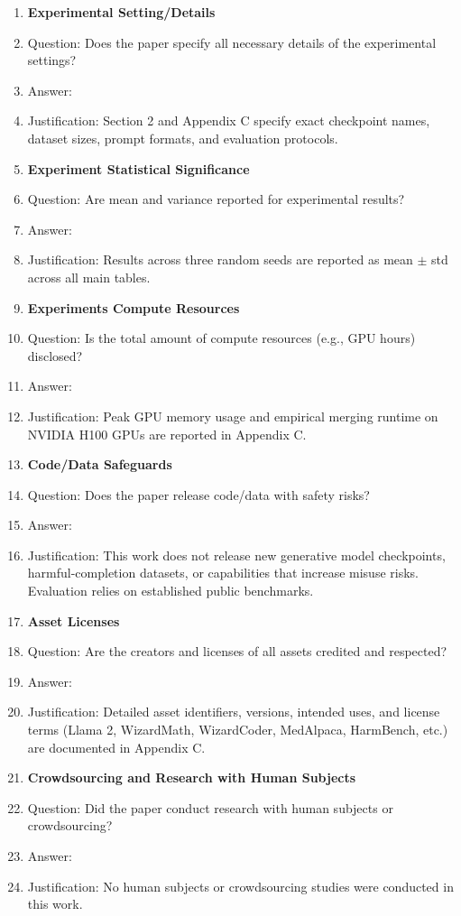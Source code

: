 \begin{enumerate}
\item {\bf Experimental Setting/Details}
  \item[] Question: Does the paper specify all necessary details of the experimental settings?
  \item[] Answer: \answerYes{}
  \item[] Justification: Section 2 and Appendix C specify exact checkpoint names, dataset sizes, prompt formats, and evaluation protocols.

\item {\bf Experiment Statistical Significance}
  \item[] Question: Are mean and variance reported for experimental results?
  \item[] Answer: \answerYes{}
  \item[] Justification: Results across three random seeds are reported as mean $\pm$ std across all main tables.

\item {\bf Experiments Compute Resources}
  \item[] Question: Is the total amount of compute resources (e.g., GPU hours) disclosed?
  \item[] Answer: \answerYes{}
  \item[] Justification: Peak GPU memory usage and empirical merging runtime on NVIDIA H100 GPUs are reported in Appendix C.

\item {\bf Code/Data Safeguards}
  \item[] Question: Does the paper release code/data with safety risks?
  \item[] Answer: \answerNA{}
  \item[] Justification: This work does not release new generative model checkpoints, harmful-completion datasets, or capabilities that increase misuse risks. Evaluation relies on established public benchmarks.

\item {\bf Asset Licenses}
  \item[] Question: Are the creators and licenses of all assets credited and respected?
  \item[] Answer: \answerYes{}
  \item[] Justification: Detailed asset identifiers, versions, intended uses, and license terms (Llama 2, WizardMath, WizardCoder, MedAlpaca, HarmBench, etc.) are documented in Appendix C.

\item {\bf Crowdsourcing and Research with Human Subjects}
  \item[] Question: Did the paper conduct research with human subjects or crowdsourcing?
  \item[] Answer: \answerNA{}
  \item[] Justification: No human subjects or crowdsourcing studies were conducted in this work.


\end{enumerate}
